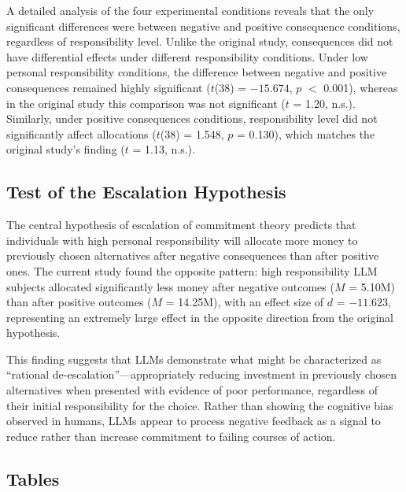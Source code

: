 \documentclass{article}
\begin{document}
A detailed analysis of the four experimental conditions reveals that the only significant differences were between negative and positive consequence conditions, regardless of responsibility level. Unlike the original study, consequences did not have differential effects under different responsibility conditions. Under low personal responsibility conditions, the difference between negative and positive consequences remained highly significant ($t$(38) = $-15.674$, $p$ $<$ 0.001), whereas in the original study this comparison was not significant ($t$ = 1.20, n.s.). Similarly, under positive consequences conditions, responsibility level did not significantly affect allocations ($t$(38) = 1.548, $p$ = 0.130), which matches the original study's finding ($t$ = 1.13, n.s.).

\subsection{Test of the Escalation Hypothesis}

The central hypothesis of escalation of commitment theory predicts that individuals with high personal responsibility will allocate more money to previously chosen alternatives after negative consequences than after positive ones. The current study found the opposite pattern: high responsibility LLM subjects allocated significantly less money after negative outcomes ($M$ = 5.10M) than after positive outcomes ($M$ = 14.25M), with an effect size of $d$ = $-11.623$, representing an extremely large effect in the opposite direction from the original hypothesis.

This finding suggests that LLMs demonstrate what might be characterized as ``rational de-escalation''---appropriately reducing investment in previously chosen alternatives when presented with evidence of poor performance, regardless of their initial responsibility for the choice. Rather than showing the cognitive bias observed in humans, LLMs appear to process negative feedback as a signal to reduce rather than increase commitment to failing courses of action.

\newpage

\subsection{Tables}
\end{document}
